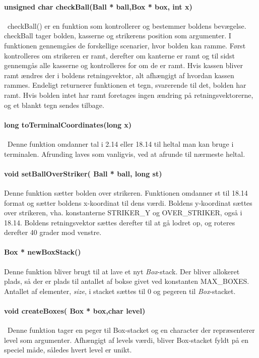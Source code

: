 \paragraph{unsigned char checkBall(Ball * ball,Box * box,  int x)}\
checkBall() er en funktion som kontrollerer og bestemmer boldens bevægelse. checkBall tager bolden, kasserne og strikerens position som argumenter. I funktionen gennemgåes de forskellige scenarier, hvor bolden kan ramme. Først kontrolleres om strikeren er ramt, derefter om kanterne er ramt og til sidst gennemgås alle kasserne og kontrolleres for om de er ramt. Hvis kassen bliver ramt ændres der i boldens retningsvektor, alt afhængigt af hvordan kassen rammes. Endeligt returnerer funktionen et tegn, svarerende til det, bolden har ramt. Hvis bolden intet har ramt foretages ingen ændring på retningsvektorerne, og et blankt tegn sendes tilbage. 
\paragraph{long toTerminalCoordinates(long x)}\
Denne funktion omdanner tal i 2.14 eller 18.14 til heltal man kan bruge i terminalen. Afrunding laves som vanligvis, ved at afrunde til nærmeste heltal.

\paragraph{void setBallOverStriker( Ball * ball, long st)}
Denne funktion sætter bolden over strikeren.
Funktionen omdanner st til 18.14 format og sætter boldens x-koordinat til dens værdi.
Boldens y-koordinat sættes over strikeren, vha. konstanterne STRIKER\_Y og OVER\_STRIKER, også i 18.14. Boldens retningsvektor sættes derefter til at gå lodret op, og roteres derefter 40 grader mod venstre.
\paragraph{Box * newBoxStack()}
Denne funktion bliver brugt til at lave et nyt \textit{Box}-stack. Der bliver allokeret plads, så der er plads til antallet af bokse givet ved konstanten MAX\_BOXES. Antallet af elementer, \textit{size}, i stacket sættes til 0 og  pegeren til \textit{Box}-stacket.
\paragraph{
void createBoxes( Box * box,char level)}\
Denne funktion tager en peger til Box-stacket og en character der repræsenterer level som argumenter.  Afhængigt af levels værdi, bliver Box-stacket fyldt på en speciel måde, således hvert level er unikt. 

